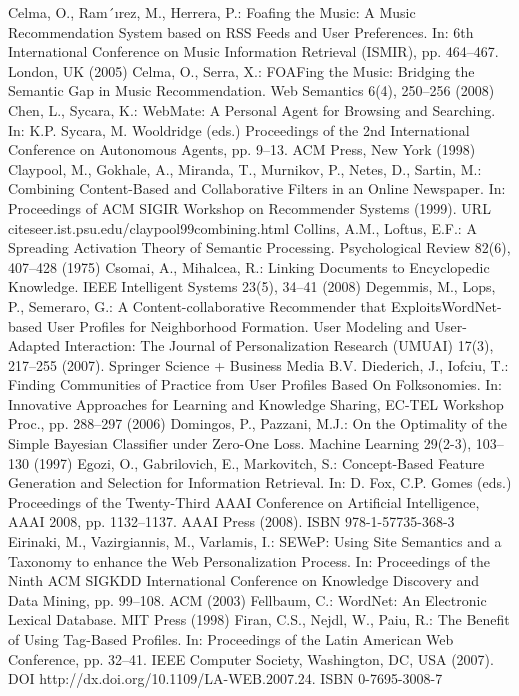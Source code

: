 \begin{thebibliography}{99}
Celma, O., Ram´ırez, M., Herrera, P.: Foafing the Music: A Music Recommendation System based on RSS Feeds and User Preferences. In: 6th International Conference on Music Information Retrieval (ISMIR), pp. 464–467. London, UK (2005)
Celma, O., Serra, X.: FOAFing the Music: Bridging the Semantic Gap in Music Recommendation. Web Semantics 6(4), 250–256 (2008)
Chen, L., Sycara, K.: WebMate: A Personal Agent for Browsing and Searching. In: K.P. Sycara, M. Wooldridge (eds.) Proceedings of the 2nd International Conference on Autonomous Agents, pp. 9–13. ACM Press, New York (1998)
Claypool, M., Gokhale, A., Miranda, T., Murnikov, P., Netes, D., Sartin, M.: Combining Content-Based and Collaborative Filters in an Online Newspaper. In: Proceedings of ACM SIGIR Workshop on Recommender Systems (1999). URL citeseer.ist.psu.edu/claypool99combining.html
Collins, A.M., Loftus, E.F.: A Spreading Activation Theory of Semantic Processing. Psychological Review 82(6), 407–428 (1975)
Csomai, A., Mihalcea, R.: Linking Documents to Encyclopedic Knowledge. IEEE Intelligent Systems 23(5), 34–41 (2008)
Degemmis, M., Lops, P., Semeraro, G.: A Content-collaborative Recommender that ExploitsWordNet- based User Profiles for Neighborhood Formation. User Modeling and User-Adapted Interaction: The Journal of Personalization Research (UMUAI) 17(3), 217–255 (2007). Springer Science + Business Media B.V.
Diederich, J., Iofciu, T.: Finding Communities of Practice from User Profiles Based On Folksonomies. In: Innovative Approaches for Learning and Knowledge Sharing, EC-TEL Workshop Proc., pp. 288–297 (2006)
Domingos, P., Pazzani, M.J.: On the Optimality of the Simple Bayesian Classifier under Zero-One Loss. Machine Learning 29(2-3), 103–130 (1997)
Egozi, O., Gabrilovich, E., Markovitch, S.: Concept-Based Feature Generation and Selection for Information Retrieval. In: D. Fox, C.P. Gomes (eds.) Proceedings of the Twenty-Third AAAI Conference on Artificial Intelligence, AAAI 2008, pp. 1132–1137. AAAI Press (2008). ISBN 978-1-57735-368-3
Eirinaki, M., Vazirgiannis, M., Varlamis, I.: SEWeP: Using Site Semantics and a Taxonomy to enhance the Web Personalization Process. In: Proceedings of the Ninth ACM SIGKDD International Conference on Knowledge Discovery and Data Mining, pp. 99–108. ACM (2003)
Fellbaum, C.: WordNet: An Electronic Lexical Database. MIT Press (1998)
Firan, C.S., Nejdl, W., Paiu, R.: The Benefit of Using Tag-Based Profiles. In: Proceedings of the Latin American Web Conference, pp. 32–41. IEEE Computer Society, Washington, DC, USA (2007). DOI http://dx.doi.org/10.1109/LA-WEB.2007.24. ISBN 0-7695-3008-7

\end{thebibliography}
